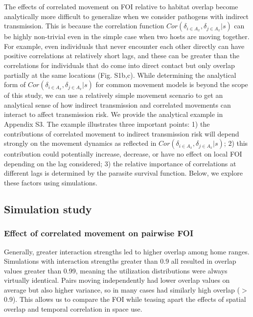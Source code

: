 \documentclass[letterpaper]{article}
\begin{document}
The effects of correlated movement on FOI relative to habitat overlap become analytically more difficult to generalize when we consider pathogens with indirect transmission.  This is because the correlation function $Cor(\delta_{i \in A_x}, \delta_{j \in A_x} | s)$ can be highly non-trivial even in the simple case when two hosts are moving together. For example, even individuals that never encounter each other directly can have positive correlations at relatively short lags, and these can be greater than the correlations for individuals that do come into direct contact but only overlap partially at the same locations (Fig. S1b,c).
While determining the analytical form of $Cor(\delta_{i \in A_x}, \delta_{j \in A_x} | s)$ for common movement models is beyond the scope of this study, we can use a relatively simple movement scenario to get an analytical sense of how indirect transmission and correlated movements can interact to affect transmission risk.  We provide the analytical example in Appendix S3. The example illustrates three important points: 1) the contributions of correlated movement to indirect transmission risk will depend strongly on the movement dynamics as reflected in $Cor(\delta_{i \in A_x}, \delta_{j \in A_x} | s)$; 2) this contribution could potentially increase, decrease, or have no effect on local FOI depending on the lag considered; 3) the relative importance of correlations at different lags is determined by the parasite survival function.
Below, we explore these factors using simulations.

\subsection*{Simulation study}

\subsubsection*{Effect of correlated movement on pairwise FOI}

Generally, greater interaction strengths led to higher overlap among home ranges. Simulations with interaction strengths greater than 0.9 all resulted in overlap values greater than 0.99, meaning the utilization distributions were always virtually identical. Pairs moving independently had lower overlap values on average but also higher variance, so in many cases had similarly high overlap ($>$0.9). This allows us to compare the FOI while teasing apart the effects of spatial overlap and temporal correlation in space use. 
\end{document}
